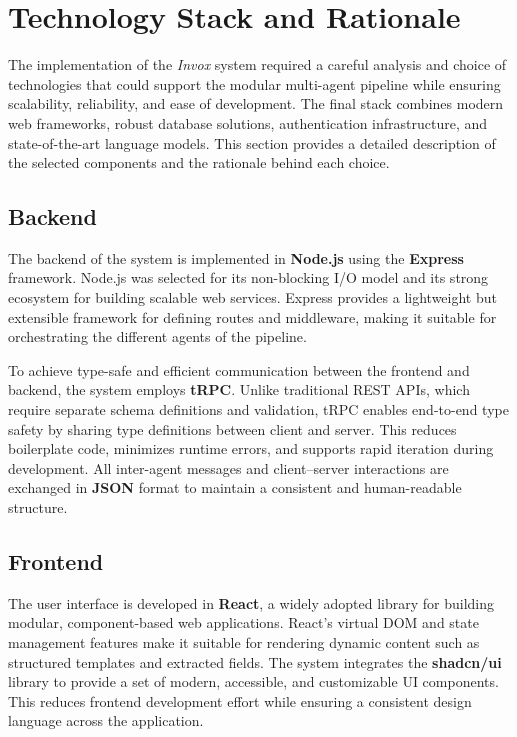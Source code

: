 \section{Technology Stack and Rationale}

The implementation of the \textit{Invox} system required a careful analysis and choice of technologies that could support the modular multi-agent pipeline while ensuring scalability, reliability, and ease of development. The final stack combines modern web frameworks, robust database solutions, authentication infrastructure, and state-of-the-art language models. This section provides a detailed description of the selected components and the rationale behind each choice.

\subsection*{Backend}
The backend of the system is implemented in \textbf{Node.js} using the \textbf{Express} framework. Node.js was selected for its non-blocking I/O model and its strong ecosystem for building scalable web services. Express provides a lightweight but extensible framework for defining routes and middleware, making it suitable for orchestrating the different agents of the pipeline.  

To achieve type-safe and efficient communication between the frontend and backend, the system employs \textbf{tRPC}. Unlike traditional REST APIs, which require separate schema definitions and validation, tRPC enables end-to-end type safety by sharing type definitions between client and server. This reduces boilerplate code, minimizes runtime errors, and supports rapid iteration during development. All inter-agent messages and client–server interactions are exchanged in \textbf{JSON} format to maintain a consistent and human-readable structure.

\subsection*{Frontend}
The user interface is developed in \textbf{React}, a widely adopted library for building modular, component-based web applications. React’s virtual DOM and state management features make it suitable for rendering dynamic content such as structured templates and extracted fields. The system integrates the \textbf{shadcn/ui} library to provide a set of modern, accessible, and customizable UI components. This reduces frontend development effort while ensuring a consistent design language across the application.

